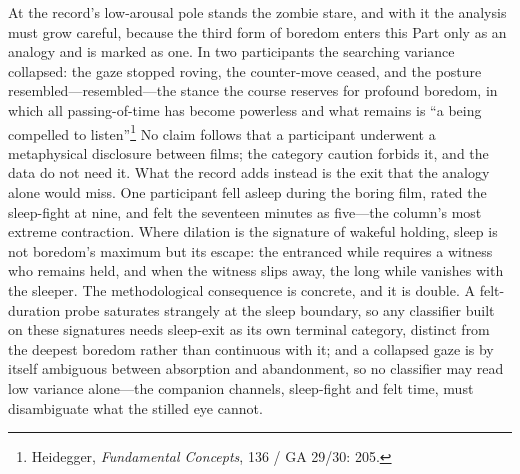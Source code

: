 At the record's low-arousal pole stands the zombie stare, and with it the analysis must grow careful, because the third form of boredom enters this Part only as an analogy and is marked as one. In two participants the searching variance collapsed: the gaze stopped roving, the counter-move ceased, and the posture resembled---resembled---the stance the course reserves for profound boredom, in which all passing-of-time has become powerless and what remains is ``a being compelled to listen''\footnote{Heidegger, \textit{Fundamental Concepts}, 136 / GA 29/30: 205.} No claim follows that a participant underwent a metaphysical disclosure between films; the category caution forbids it, and the data do not need it. What the record adds instead is the exit that the analogy alone would miss. One participant fell asleep during the boring film, rated the sleep-fight at nine, and felt the seventeen minutes as five---the column's most extreme contraction. Where dilation is the signature of wakeful holding, sleep is not boredom's maximum but its escape: the entranced while requires a witness who remains held, and when the witness slips away, the long while vanishes with the sleeper. The methodological consequence is concrete, and it is double. A felt-duration probe saturates strangely at the sleep boundary, so any classifier built on these signatures needs sleep-exit as its own terminal category, distinct from the deepest boredom rather than continuous with it; and a collapsed gaze is by itself ambiguous between absorption and abandonment, so no classifier may read low variance alone---the companion channels, sleep-fight and felt time, must disambiguate what the stilled eye cannot.

